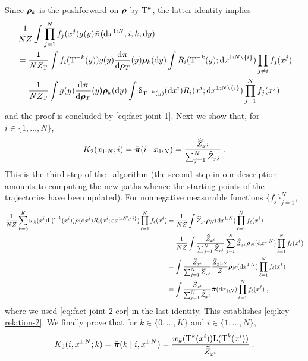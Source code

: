 Since $\boldsymbol{\rho}_k$ is the pushforward on $\boldsymbol{\rho}$ by $\operatorname{T}^k$, the latter identity implies
\begin{align*}
& \frac{1}{N Z} \int \prod_{j=1}^N f_j(x^j) g(y) \bar{\boldsymbol{\pi}}(\mathrm{d} x^{1:N},i,k,\mathrm{d} y) \\
& =\frac{1}{N Z_{\operatorname{T}}} \int f_i(\operatorname{T}^{-k}(y)) g(y) \frac{\mathrm{d} \boldsymbol{\pi}}{\mathrm{d} \boldsymbol{\rho}_T}(y) \boldsymbol{\rho}_k(\mathrm{d} y) \int R_i(\operatorname{T}^{-k}(y); \mathrm{d} x^{1:N \setminus \{i\}}) \prod_{j \neq i} f_j(x^j) \\
&= \frac{1}{N Z_{\operatorname{T}}} \int g(y) \frac{\mathrm{d} \boldsymbol{\pi}}{\mathrm{d} \boldsymbol{\rho}_T}(y) \boldsymbol{\rho}_k(\mathrm{d} y) \int \updelta_{\operatorname{T}^{-k}(y)}(\mathrm{d} x^i)  R_i(x^i; \mathrm{d} x^{1:N \setminus \{i\}}) \prod_{j=1}^N f_j(x^j)
\end{align*}
and the proof is concluded by \eqref{eq:fact-joint-1}. Next we show that, for $i \in \{1,\dots,N\}$,
\begin{equation}
\label{eq:key-relation-2}
K_{2}(x_{1:N}; i)= \bar{\boldsymbol{\pi}}(i \mid x_{1:N})=  \frac{\widehat{Z}_{x^i}}{\sum_{j=1}^N \widehat{Z}_{x^j}} \;.
\end{equation}
This is the third step of the \IFIS\ algorithm (the second step in our description amounts to computing the new paths whence the starting points of the trajectories have been updated).
For nonnegative measurable functions $\{f_j\}_{j=1}^N$,
\begin{align*}
\frac{1}{N Z} \sum_{k=0}^K w_k(x^i) \mathrm{L}(\operatorname{T}^k(x^i)) \boldsymbol{\rho}(\mathrm{d} x^i) R_i(x^i; \mathrm{d} x^{1:N \setminus \{i\}}) \prod_{\ell=1}^N f_\ell(x^\ell)
&= \frac{1}{N Z} \int \widehat{Z}_{x^i} \boldsymbol{\rho}_N(\mathrm{d} x^{1:N}) \prod_{\ell=1}^N f_\ell(x^\ell) \\
&= \frac{1}{N Z} \int \frac{\widehat{Z}_{x^i}}{\sum_{j=1}^N \widehat{Z}_{x^j}} \sum_{j=1}^N \widehat{Z}_{x^j} \boldsymbol{\rho}_N(\mathrm{d} x^{1:N}) \prod_{\ell=1}^N f_\ell(x^\ell) \\
&=
\int \frac{\widehat{Z}_{x^i}}{\sum_{j=1}^N \widehat{Z}_{x^j}} \frac{\widehat{Z}_{x^{1:N}}}{Z} \boldsymbol{\rho}_N(\mathrm{d} x^{1:N}) \prod_{\ell=1}^N f_\ell(x^\ell) \\
&=  \int \frac{\widehat{Z}_{x^i}}{\sum_{j=1}^N \widehat{Z}_{x^j}} \bar{\boldsymbol{\pi}}(\mathrm{d} x_{1:N}) \prod_{\ell=1}^N f_\ell(x^\ell)\;,
\end{align*}
where we used \eqref{eq:fact-joint-2-cor} in the last identity. This establishes \eqref{eq:key-relation-2}. We finally prove that for $k \in \{0,\dots,K\}$ and $i \in \{1,\dots,N\}$,
\begin{equation}
\label{eq:key-relation-3}
K_3(i,x^{1:N}; k)= \bar{\boldsymbol{\pi}}(k \mid i,x^{1:N})=   \frac{w_k(\operatorname{T}^k(x^i)) \mathrm{L}(\operatorname{T}^k(x^i))}{\widehat{Z}_{x^i}} \;.
\end{equation}
